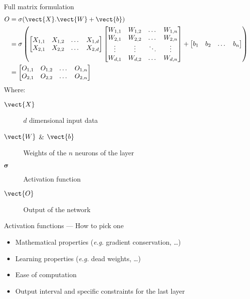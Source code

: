 \begin{frame}{Full matrix formulation}
  \footnotesize
  \begin{align*}
    O & = \sigma (\vect{X}.\vect{W} + \vect{b}) \\
    & = \sigma \left(
    \begin{bmatrix}
      X_{1,1} & X_{1,2} & \dots & X_{1,d} \\
      X_{2,1} & X_{2,2} & \dots & X_{2,d}
    \end{bmatrix}
    \begin{bmatrix}
      W_{1,1} & W_{1,2} & \dots  & W_{1,n} \\
      W_{2,1} & W_{2,2} & \dots  & W_{2,n} \\
      \vdots & \vdots & \ddots & \vdots \\
      W_{d,1} & W_{d,2} & \dots  & W_{d,n}
    \end{bmatrix}
    +
    \begin{bmatrix}
      b_1 & b_2 & \dots & b_n
    \end{bmatrix}
    \right) \\
    & = \begin{bmatrix}
      O_{1,1} & O_{1,2} & \dots & O_{1,n} \\
      O_{2,1} & O_{2,2} & \dots & O_{2,n}
    \end{bmatrix}
  \end{align*}
  Where:
  \begin{description}
    \item[$\vect{X}$] $d$ dimensional input data
    \item[$\vect{W}$ \& $\vect{b}$] Weights of the $n$ neurons of the layer
    \item[$\bm{\sigma}$] Activation function
    \item[$\vect{O}$] Output of the network
  \end{description}
\end{frame}

\begin{frame}{Activation functions --- How to pick one}
  \begin{itemize}
    \item Mathematical properties (\emph{e.g.} gradient conservation, …)
    \item Learning properties (\emph{e.g.} dead weights, …)
    \item Ease of computation
    \item Output interval and specific constraints for the last layer
  \end{itemize}
\end{frame}


